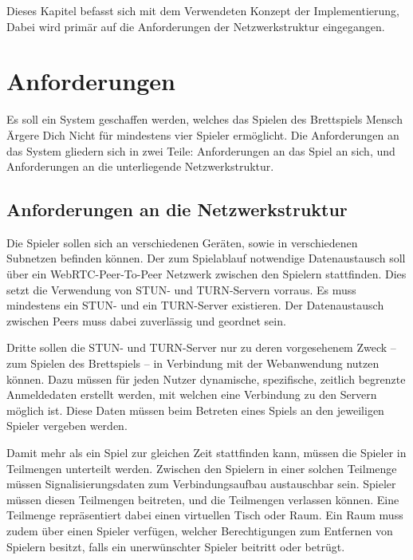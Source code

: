 Dieses Kapitel befasst sich mit dem Verwendeten Konzept der Implementierung, Dabei wird primär auf die Anforderungen der Netzwerkstruktur eingegangen.

\section{Anforderungen}
Es soll ein System geschaffen werden, welches das Spielen des Brettspiels \glqq{}Mensch Ärgere Dich Nicht\grqq{} für mindestens vier Spieler ermöglicht. Die Anforderungen an das System gliedern sich in zwei Teile: Anforderungen an das Spiel an sich, und Anforderungen an die unterliegende Netzwerkstruktur.\par

\subsection{Anforderungen an die Netzwerkstruktur}
Die Spieler sollen sich an verschiedenen Geräten, sowie in verschiedenen Subnetzen befinden können. Der zum Spielablauf notwendige Datenaustausch soll über ein \acs{WebRTC}-Peer-To-Peer Netzwerk zwischen den Spielern stattfinden. Dies setzt die Verwendung von STUN- und TURN-Servern vorraus. Es muss mindestens ein STUN- und ein TURN-Server existieren. Der Datenaustausch zwischen Peers muss dabei zuverlässig und geordnet sein.\par

Dritte sollen die STUN- und TURN-Server nur zu deren vorgesehenem Zweck -- zum Spielen des Brettspiels -- in Verbindung mit der Webanwendung nutzen können. Dazu müssen für jeden Nutzer dynamische, spezifische, zeitlich begrenzte Anmeldedaten erstellt werden, mit welchen eine Verbindung zu den Servern möglich ist. Diese Daten müssen beim Betreten eines Spiels an den jeweiligen Spieler vergeben werden.\par

\label{section:weitere}
Damit mehr als ein Spiel zur gleichen Zeit stattfinden kann, müssen die Spieler in Teilmengen unterteilt werden. Zwischen den Spielern in einer solchen Teilmenge müssen Signalisierungsdaten zum Verbindungsaufbau austauschbar sein. Spieler müssen diesen Teilmengen beitreten, und die Teilmengen verlassen können. Eine Teilmenge repräsentiert dabei einen virtuellen \glqq{}Tisch\grqq{} oder \glqq{}Raum\grqq{}. Ein \glqq{}Raum\grqq{} muss zudem über einen Spieler verfügen, welcher Berechtigungen zum Entfernen von Spielern besitzt, falls ein unerwünschter Spieler beitritt oder betrügt.\par

